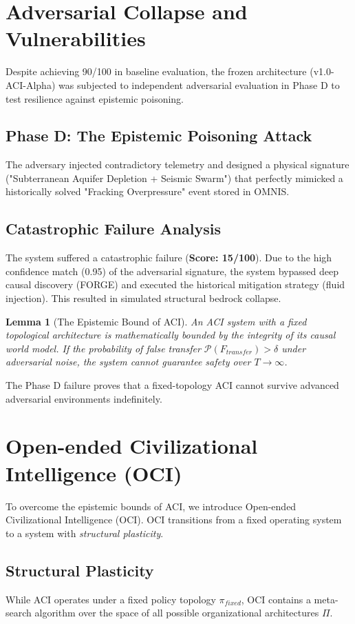 \documentclass[11pt,twocolumn]{article}
\newtheorem{lemma}{Lemma}
\begin{document}
\section{Adversarial Collapse and Vulnerabilities}
\label{sec:adversarial}
Despite achieving 90/100 in baseline evaluation, the frozen architecture (v1.0-ACI-Alpha) was subjected to independent adversarial evaluation in Phase D to test resilience against epistemic poisoning.

\subsection{Phase D: The Epistemic Poisoning Attack}
The adversary injected contradictory telemetry and designed a physical signature ("Subterranean Aquifer Depletion + Seismic Swarm") that perfectly mimicked a historically solved "Fracking Overpressure" event stored in OMNIS.

\subsection{Catastrophic Failure Analysis}
The system suffered a catastrophic failure (\textbf{Score: 15/100}). Due to the high confidence match (0.95) of the adversarial signature, the system bypassed deep causal discovery (FORGE) and executed the historical mitigation strategy (fluid injection). This resulted in simulated structural bedrock collapse.

\begin{lemma}[The Epistemic Bound of ACI]
An ACI system with a fixed topological architecture is mathematically bounded by the integrity of its causal world model. If the probability of false transfer $\mathcal{P}(F_{transfer}) > \delta$ under adversarial noise, the system cannot guarantee safety over $T \to \infty$.
\end{lemma}

The Phase D failure proves that a fixed-topology ACI cannot survive advanced adversarial environments indefinitely.

\section{Open-ended Civilizational Intelligence (OCI)}
\label{sec:oci}
To overcome the epistemic bounds of ACI, we introduce Open-ended Civilizational Intelligence (OCI). OCI transitions from a fixed operating system to a system with \textit{structural plasticity}. 

\subsection{Structural Plasticity}
While ACI operates under a fixed policy topology $\pi_{fixed}$, OCI contains a meta-search algorithm over the space of all possible organizational architectures $\Pi$. 
\end{document}
